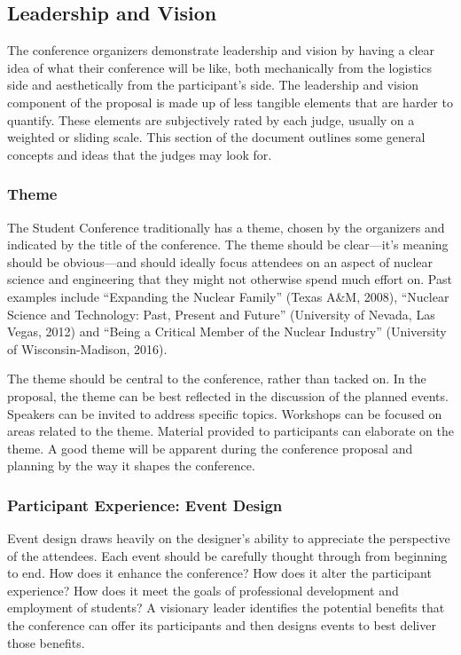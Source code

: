 \documentclass[12pt]{article}
\begin{document}
\subsection{Leadership and Vision} \label{sec:LandV2}
The conference organizers demonstrate leadership and vision by having a clear idea of
what their conference will be like, both mechanically from the logistics side and
aesthetically from the participant’s side. The leadership and vision component of the
proposal is made up of less tangible elements that are harder to quantify. These elements
are subjectively rated by each judge, usually on a weighted or sliding scale. This section
of the document outlines some general concepts and ideas that the judges may look for.


\subsubsection{Theme}
The Student Conference traditionally has a theme, chosen by the organizers and indicated
by the title of the conference. The theme should be clear---it's meaning should be obvious---and should ideally focus attendees on an aspect of nuclear science and
engineering that they might not otherwise spend much effort on. Past examples include
“Expanding the Nuclear Family” (Texas A\&M, 2008), “Nuclear Science and Technology: Past, Present and Future” (University of Nevada, Las Vegas, 2012) and “Being a Critical Member of the Nuclear Industry” (University of Wisconsin-Madison, 2016).

The theme should be central to the conference, rather than tacked on. In the proposal, the theme can be best reflected in the discussion of the planned events. Speakers can
be invited to address specific topics. Workshops can be focused on areas related to the
theme. Material provided to participants can elaborate on the theme. A good theme will be apparent during the conference proposal and planning by the way it shapes the conference.

\subsubsection{Participant Experience: Event Design}
Event design draws heavily on the designer’s ability to appreciate the perspective of the
attendees. Each event should be carefully thought through from beginning to end. How
does it enhance the conference? How does it alter the participant experience? How does
it meet the goals of professional development and employment of students? A visionary
leader identifies the potential benefits that the conference can offer its participants and
then designs events to best deliver those benefits.
\end{document}
